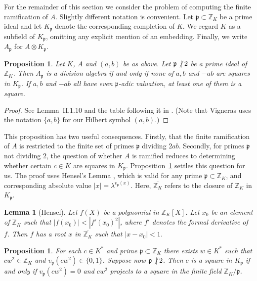 \documentclass[a4paper]{amsart}
\def\Z{{\mathbb Z}}
\def\cal{\mathcal}
\def\O{{\cal O}}
\def\Otil{\tilde{\O}}
\def\p{{\mathfrak p}}
\newtheorem{lemma}[theorem]{Lemma}
\newtheorem{proposition}[theorem]{Proposition}
\theoremstyle{definition}
\begin{document}
\def\Kp{K_{\p}}

For the remainder of this section we consider the problem of computing
the finite ramification of $A$. Slightly different notation is
convenient. 
Let $\p\subset\Z_K$ be a prime ideal and let $\Kp$ denote the
corresponding completion of $K$. We regard $K$ as a
subfield of $\Kp$, omitting any explicit mention of an embedding. 
Finally, we write $A_{\p}$ for $A\otimes\Kp$. 

\begin{proposition} \label{hilsym}
Let $K$, $A$ and $(a,b)$ be as above. 
Let $\p\not\:\mid 2$ be a prime ideal of $\Z_K$. Then
$A_{\p}$ is a division algebra if and only if none of $a, b$ and $-ab$ are
squares in $\Kp$. If $a, b$ and $-ab$ all have even $\p$-adic
valuation, at least one of them is a square. 
\end{proposition}

\begin{proof}
See Lemma~II.1.10 and the table following it in \cite{vigneras}.
(Note that Vigneras uses the notation $\{a,b\}$ for our Hilbert
symbol $(a,b)$.)
\end{proof}

\def\Otil{\overline{\Z_K}}

This proposition has two useful consequences. Firstly, that the
finite ramification of $A$ is restricted to the finite set of 
primes $\p$ dividing $2ab$.
Secondly, for primes $\p$ not dividing $2$, the question of whether $A$ is
ramified reduces to determining whether
certain $c\in K$ are squares in $K_{\p}$. Proposition~\ref{qr} settles
this question for us. The proof uses Hensel's Lemma \cite[page 42]{lang},
which is valid for any prime
$\p\subset \Z_K$, and corresponding absolute value $|x | = \lambda^{v_{\p}(x)}$. 
Here, $\Otil$  refers to the closure of $\Z_K$ in $\Kp$. 

\begin{lemma}[Hensel] \label{hensel}
Let $f(X)$ be a polynomial in $\Z_K[X]$. Let $x_0$ be an element of $\Z_K$
such that $|f(x_0)| < |f'(x_0)^2|$, where $f'$ denotes the formal
derivative of $f$. Then $f$ has a root $x$ in $\Otil$ such that 
$|x - x_0| < 1$.
\end{lemma}

\begin{proposition} \label{qr}
For each $c\in K^*$ 
and prime $\p\subset\Z_K$ there exists
$w\in K^*$ such that $cw^2 \in \Z_K$ and $v_{\p}(cw^2) \in \{0,1\}$.
Suppose now $\p\not\:\mid 2$.
Then $c$ is a square in $\Kp$ if and only if $v_{\p}(cw^2) = 0$ and $cw^2$ projects to
a square in the finite field $\Z_K/\p$. 
\end{proposition}
\end{document}
